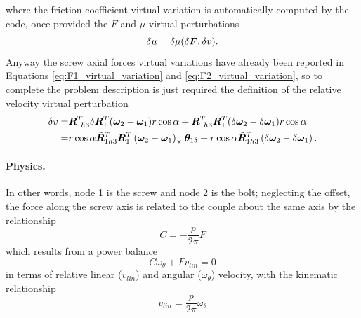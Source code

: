 where the friction coefficient virtual variation is automatically computed by the code,
once provided the $F$ and $\mu$ virtual perturbations
\begin{equation}
  \delta\mu=\delta\mu(\delta\bm{F}, \delta v).
\end{equation}
Anyway the screw axial forces virtual variations have already been reported in Equations
\ref{eq:F1_virtual_variation} and \ref{eq:F2_virtual_variation}, so to complete the problem description is just required the 
definition of the relative velocity virtual perturbation 
\begin{align}
  \nonumber
  \delta v=&\tilde{\bm{R}}_{1h3}^T\delta\bm{R}_1^T(\bm{\omega}_2-\bm{\omega}_1)r\cos{\alpha}+
            \tilde{\bm{R}}_{1h3}^T\bm{R}_1^T(\delta\bm{\omega}_2-\delta\bm{\omega}_1)r\cos{\alpha} \\
	  =& r\cos{\alpha}\tilde{\bm{R}}_{1h3}^T
	      \bm{R}_1^T\left(\bm{\omega}_2-\bm{\omega}_1\right)_{\times}\bm{\theta}_{1\delta}+
	      r\cos{\alpha}\tilde{\bm{R}}_{1h3}^T\left(\delta\bm{\omega}_2-\delta\bm{\omega}_1\right).
\end{align}



\paragraph{Physics.}
In other words, node 1 is the screw and node 2 is the bolt;
neglecting the offset, the force along the screw axis is related
to the couple about the same axis by the relationship
\begin{equation}
	C = - \frac{p}{2\pi} F
\end{equation}
which results from a power balance
\begin{equation}
  C \omega_\theta + F v_{lin} = 0
\end{equation}
in terms of relative linear ($v_{lin}$) and angular ($\omega_\theta$) velocity,
with the kinematic relationship
\begin{equation} 
  v_{lin} = \frac{p}{2\pi} \omega_\theta
\end{equation}

